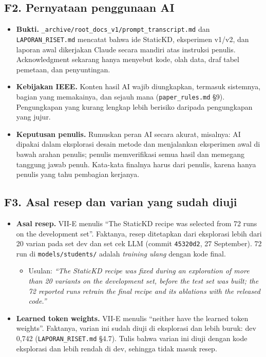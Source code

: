 \documentclass[10pt,a4paper]{article}
\begin{document}
\subsection*{F2. Pernyataan penggunaan AI}
\begin{itemize}
  \item \textbf{Bukti.} \texttt{\_archive/root\_docs\_v1/prompt\_transcript.md} dan \texttt{LAPORAN\_RISET.md} mencatat bahwa ide StaticKD, eksperimen v1/v2, dan laporan awal dikerjakan Claude secara mandiri atas instruksi penulis. Acknowledgment sekarang hanya menyebut kode, olah data, draf tabel pemetaan, dan penyuntingan.
  \item \textbf{Kebijakan IEEE.} Konten hasil AI wajib diungkapkan, termasuk sistemnya, bagian yang memakainya, dan sejauh mana (\texttt{paper\_rules.md} §9). Pengungkapan yang kurang lengkap lebih berisiko daripada pengungkapan yang jujur.
  \item \textbf{Keputusan penulis.} Rumuskan peran AI secara akurat, misalnya: AI dipakai dalam eksplorasi desain metode dan menjalankan eksperimen awal di bawah arahan penulis; penulis memverifikasi semua hasil dan memegang tanggung jawab penuh. Kata-kata finalnya harus dari penulis, karena hanya penulis yang tahu pembagian kerjanya.
\end{itemize}

\subsection*{F3. Asal resep dan varian yang sudah diuji}
\begin{itemize}
  \item \textbf{Asal resep.} VII-E menulis ``The StaticKD recipe was selected from 72 runs on the development set''. Faktanya, resep ditetapkan dari eksplorasi lebih dari 20 varian pada set dev dan set cek LLM (commit \texttt{45320d2}, 27 September). 72 run di \texttt{models/students/} adalah \emph{training ulang} dengan kode final.
    \begin{itemize}
      \item Usulan: \emph{``The StaticKD recipe was fixed during an exploration of more than 20 variants on the development set, before the test set was built; the 72 reported runs retrain the final recipe and its ablations with the released code.''}
    \end{itemize}
  \item \textbf{Learned token weights.} VII-E menulis ``neither have the learned token weights''. Faktanya, varian ini sudah diuji di eksplorasi dan lebih buruk: dev 0,742 (\texttt{LAPORAN\_RISET.md} §4.7). Tulis bahwa varian ini diuji dengan kode eksplorasi dan lebih rendah di dev, sehingga tidak masuk resep.
\end{itemize}
\end{document}
